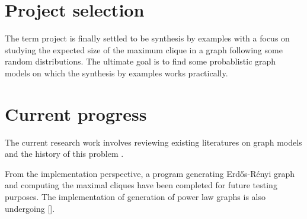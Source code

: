 \documentclass{article}
\begin{document}
\newpage
\maketitle

\section{Project selection}
The term project is finally settled to be synthesis by examples with a focus on studying the expected size of the maximum clique in a graph following some random distributions. The ultimate goal is to find some probablistic graph models on which the synthesis by examples works practically.

\section{Current progress}
The current research work involves reviewing existing literatures on graph models \cite{aiello2000random,easley2010networks} and the history of this problem \cite{gulwani2012spreadsheet,rolim2017learning,d2017nofaq}. 

From the implementation perspective, a program generating Erd\H{o}s-R\'enyi graph and computing the maximal cliques have been completed for future testing purposes. The implementation of generation of power law graphs is also undergoing [].

 
{}

\end{document}
